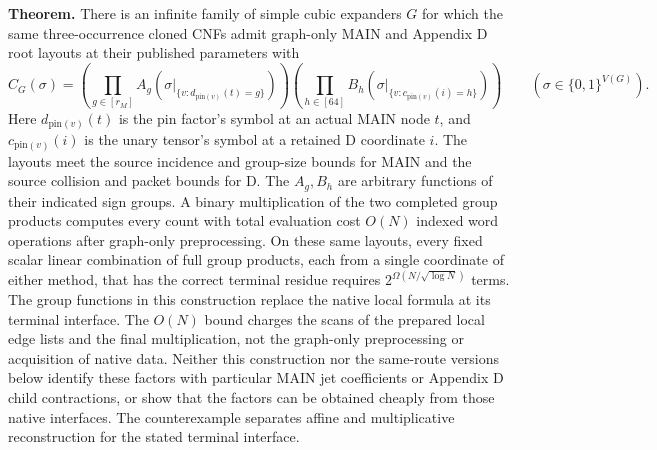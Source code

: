 \documentclass[
  11pt,
]{article}
\begin{document}
\textbf{Theorem.} There is an infinite family of simple cubic expanders
\(G\) for which the same three-occurrence cloned CNFs admit graph-only
MAIN and Appendix D root layouts at their published parameters with \[
 C_G(\sigma)=
 \left(\prod_{g\in[r_M]} A_g(\sigma|_{\{v:d_{\mathrm{pin}(v)}(t)=g\}})\right)
 \left(\prod_{h\in[64]} B_h(\sigma|_{\{v:c_{\mathrm{pin}(v)}(i)=h\}})\right)
 \qquad(\sigma\in\{0,1\}^{V(G)}).
\] Here \(d_{\mathrm{pin}(v)}(t)\) is the pin factor's symbol at an
actual MAIN node \(t\), and \(c_{\mathrm{pin}(v)}(i)\) is the unary
tensor's symbol at a retained D coordinate \(i\). The layouts meet the
source incidence and group-size bounds for MAIN and the source collision
and packet bounds for D. The \(A_g,B_h\) are arbitrary functions of
their indicated sign groups. A binary multiplication of the two
completed group products computes every count with total evaluation cost
\(O(N)\) indexed word operations after graph-only preprocessing. On
these same layouts, every fixed scalar linear combination of full group
products, each from a single coordinate of either method, that has the
correct terminal residue requires \(2^{\Omega(N/\sqrt{\log N})}\) terms.
The group functions in this construction replace the native local
formula at its terminal interface. The \(O(N)\) bound charges the scans
of the prepared local edge lists and the final multiplication, not the
graph-only preprocessing or acquisition of native data. Neither this
construction nor the same-route versions below identify these factors
with particular MAIN jet coefficients or Appendix D child contractions,
or show that the factors can be obtained cheaply from those native
interfaces. The counterexample separates affine and multiplicative
reconstruction for the stated terminal interface.
\end{document}
